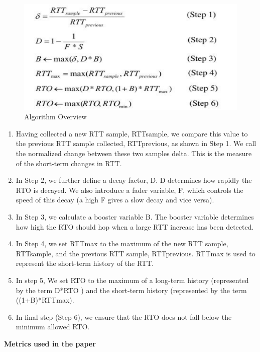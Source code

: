 \documentclass{article}[12pt]
\begin{document}
\begin{figure}[!h]
	\centering
	\includegraphics[width=.9\textwidth]{Pictures/algo/algo.png}
	\caption{Algorithm Overview}
\end{figure}

   \begin{enumerate}
	\item Having collected a new RTT sample, RTTsample,
	we compare this value to the previous RTT
	sample collected, RTTprevious, as shown in Step
	1. We call the normalized change between these
	two samples delta. This is the measure of the
	short-term changes in RTT.
	\item In Step 2, we further define a decay factor, D. D
	determines how rapidly the RTO is decayed. We
	also introduce a fader variable, F, which controls
	the speed of this decay (a high F gives a slow
	decay and vice versa).
	\item In Step 3, we calculate a booster variable B.
	The booster variable determines how high the
	RTO should hop when a large RTT increase
	has been detected.
	\item  In Step 4, we set RTTmax to the maximum of
	the new RTT sample, RTTsample, and the
	previous RTT sample, RTTprevious. RTTmax is
	used to represent the short-term history of the
	RTT.
	\item  In step 5, We set RTO to the maximum of a
	long-term history (represented by the term
	D*RTO ) and the short-term history
	(represented by the term ((1+B)*RTTmax).
	\item  In final step (Step 6), we ensure that the RTO
	does not fall below the minimum allowed RTO.
\end{enumerate}

\textbf{Metrics used in the paper}
\end{document}
